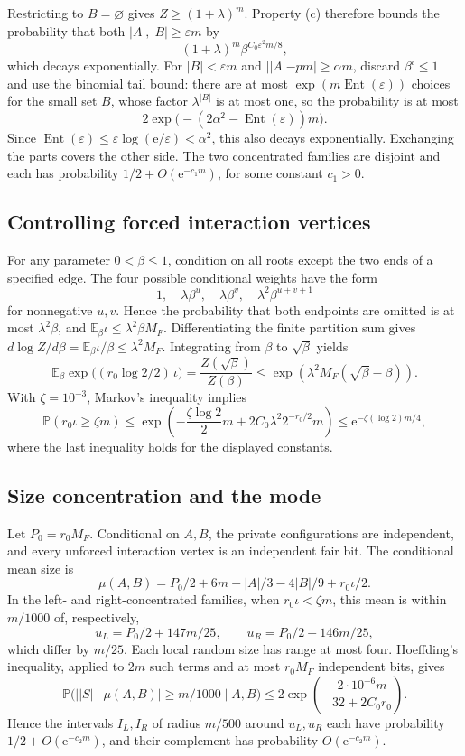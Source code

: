\documentclass[11pt,a4paper]{article}
\theoremstyle{definition}
\theoremstyle{remark}
\newcommand{\Prb}{\mathbb P}
\newcommand{\E}{\mathbb E}
\newcommand{\Ent}{\operatorname{Ent}}
\begin{document}
Restricting to $B=\varnothing$ gives $Z\ge(1+\lambda)^m$. Property (c) therefore bounds the probability that both $|A|,|B|\ge\varepsilon m$ by
\[
(1+\lambda)^m\beta^{C_0\varepsilon^2m/8},
\]
which decays exponentially. For $|B|<\varepsilon m$ and $||A|-pm|\ge\alpha m$, discard $\beta^\iota\le1$ and use the binomial tail bound: there are at most $\exp(m\Ent(\varepsilon))$ choices for the small set $B$, whose factor $\lambda^{|B|}$ is at most one, so the probability is at most
\[
2\exp\bigl(-(2\alpha^2-\Ent(\varepsilon))m\bigr).
\]
Since $\Ent(\varepsilon)\le\varepsilon\log(\mathrm e/\varepsilon)<\alpha^2$, this also decays exponentially. Exchanging the parts covers the other side. The two concentrated families are disjoint and each has probability $1/2+O(\mathrm e^{-c_1m})$, for some constant $c_1>0$.

\subsection{Controlling forced interaction vertices}
For any parameter $0<\beta\le1$, condition on all roots except the two ends of a specified edge. The four possible conditional weights have the form
\[
1,\quad\lambda\beta^u,\quad\lambda\beta^v,\quad
\lambda^2\beta^{u+v+1}
\]
for nonnegative $u,v$. Hence the probability that both endpoints are omitted is at most $\lambda^2\beta$, and $\E_\beta\iota\le\lambda^2\beta M_F$. Differentiating the finite partition sum gives
$d\log Z/d\beta=\E_\beta\iota/\beta\le\lambda^2M_F$.
Integrating from $\beta$ to $\sqrt\beta$ yields
\[
\E_\beta\exp\bigl((r_0\log2/2)\,\iota\bigr)
=\frac{Z(\sqrt\beta)}{Z(\beta)}
\le\exp(\lambda^2M_F(\sqrt\beta-\beta)).
\]
With $\zeta=10^{-3}$, Markov's inequality implies
\[
\Prb(r_0\iota\ge\zeta m)
\le\exp\left(-\frac{\zeta\log2}{2}m
+2C_0\lambda^2 2^{-r_0/2}m\right)
\le \mathrm e^{-\zeta(\log2)m/4},
\]
where the last inequality holds for the displayed constants.

\subsection{Size concentration and the mode}
Let $P_0=r_0M_F$. Conditional on $A,B$, the private configurations are independent, and every unforced interaction vertex is an independent fair bit. The conditional mean size is
\[
\mu(A,B)=P_0/2+6m-|A|/3-4|B|/9+r_0\iota/2.
\]
In the left- and right-concentrated families, when $r_0\iota<\zeta m$, this mean is within $m/1000$ of, respectively,
\[
u_L=P_0/2+147m/25,\qquad
u_R=P_0/2+146m/25 ,
\]
which differ by $m/25$. Each local random size has range at most four. Hoeffding's inequality, applied to $2m$ such terms and at most $r_0M_F$ independent bits, gives
\[
\Prb\bigl(||S|-\mu(A,B)|\ge m/1000\mid A,B\bigr)
\le2\exp\left(-\frac{2\cdot10^{-6}m}{32+2C_0r_0}\right).
\]
Hence the intervals $I_L,I_R$ of radius $m/500$ around $u_L,u_R$ each have probability $1/2+O(\mathrm e^{-c_2m})$, and their complement has probability $O(\mathrm e^{-c_2m})$.
\end{document}
